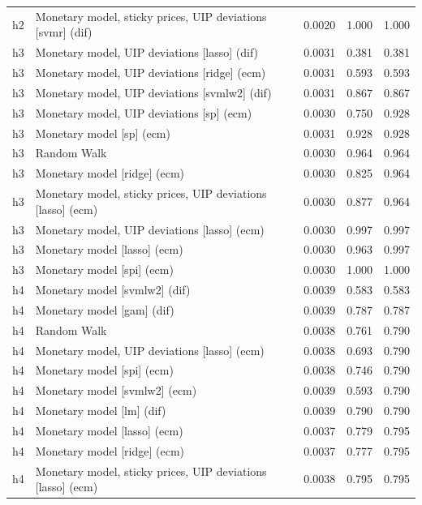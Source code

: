 \begin{ThreePartTable}
\begin{longtable}[t]{cp{5.5cm}ccc}
h2 & \raggedright Monetary model, sticky prices, UIP deviations [svmr] (dif) & 0.0020 & 1.000 & 1.000\\
\addlinespace
h3 & \raggedright Monetary model, UIP deviations [lasso] (dif) & 0.0031 & 0.381 & 0.381\\
h3 & \raggedright Monetary model, UIP deviations [ridge] (ecm) & 0.0031 & 0.593 & 0.593\\
h3 & \raggedright Monetary model, UIP deviations [svmlw2] (dif) & 0.0031 & 0.867 & 0.867\\
h3 & \raggedright Monetary model, UIP deviations [sp] (ecm) & 0.0030 & 0.750 & 0.928\\
h3 & \raggedright Monetary model [sp] (ecm) & 0.0031 & 0.928 & 0.928\\
h3 & \raggedright Random Walk & 0.0030 & 0.964 & 0.964\\
h3 & \raggedright Monetary model [ridge] (ecm) & 0.0030 & 0.825 & 0.964\\
h3 & \raggedright Monetary model, sticky prices, UIP deviations [lasso] (ecm) & 0.0030 & 0.877 & 0.964\\
h3 & \raggedright Monetary model, UIP deviations [lasso] (ecm) & 0.0030 & 0.997 & 0.997\\
h3 & \raggedright Monetary model [lasso] (ecm) & 0.0030 & 0.963 & 0.997\\
h3 & \raggedright Monetary model [spi] (ecm) & 0.0030 & 1.000 & 1.000\\
\addlinespace
h4 & \raggedright Monetary model [svmlw2] (dif) & 0.0039 & 0.583 & 0.583\\
h4 & \raggedright Monetary model [gam] (dif) & 0.0039 & 0.787 & 0.787\\
h4 & \raggedright Random Walk & 0.0038 & 0.761 & 0.790\\
h4 & \raggedright Monetary model, UIP deviations [lasso] (ecm) & 0.0038 & 0.693 & 0.790\\
h4 & \raggedright Monetary model [spi] (ecm) & 0.0038 & 0.746 & 0.790\\
h4 & \raggedright Monetary model [svmlw2] (ecm) & 0.0039 & 0.593 & 0.790\\
h4 & \raggedright Monetary model [lm] (dif) & 0.0039 & 0.790 & 0.790\\
h4 & \raggedright Monetary model [lasso] (ecm) & 0.0037 & 0.779 & 0.795\\
h4 & \raggedright Monetary model [ridge] (ecm) & 0.0037 & 0.777 & 0.795\\
h4 & \raggedright Monetary model, sticky prices, UIP deviations [lasso] (ecm) & 0.0038 & 0.795 & 0.795\\

\end{longtable}
\end{ThreePartTable}
